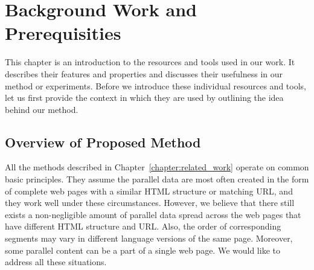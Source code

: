 
\chapter{Background Work and Prerequisities}
\label{chapter:background_work_and_prerequisities}

This chapter is an introduction to the resources and tools used in our work. It describes their features and properties and discusses their usefulness in our method or experiments. Before we introduce these individual resources and tools, let us first provide the context in which they are used by outlining the idea behind our method.

\section{Overview of Proposed Method}
\label{section:overview_of_proposed_method}

All the methods described in Chapter~\ref{chapter:related_work} operate on common basic principles. They assume the parallel data are most often created in the form of complete web pages with a similar HTML structure or matching URL, and they work well under these circumstances. However, we believe that there still exists a non-negligible amount of parallel data spread across the web pages that have different HTML structure and URL. Also, the order of corresponding segments may vary in different language versions of the same page. Moreover, some parallel content can be a part of a single web page. We would like to address all these situations.

